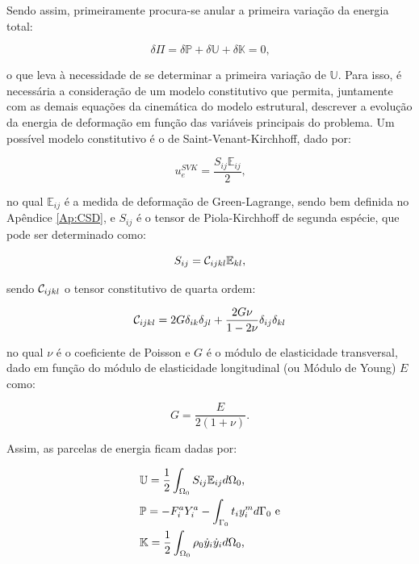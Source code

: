 Sendo assim, primeiramente procura-se anular a primeira variação da energia total:

\begin{equation}
    \delta\Pi=\delta\mathbb{P}+\delta\mathbb{U}+\delta\mathbb{K}=0\text{,}
\end{equation}

\noindent o que leva à necessidade de se determinar a primeira variação de $\mathbb{U}$. Para isso, é necessária a consideração de um modelo constitutivo que permita, juntamente com as demais equações da cinemática do modelo estrutural, descrever a evolução da energia de deformação em função das variáveis principais do problema. Um possível modelo constitutivo é o de Saint-Venant-Kirchhoff, dado por:

\begin{equation}
    u_e^{SVK}=\frac{S_{ij}\mathbb{E}_{ij}}{2}\text{,}
\end{equation}

\noindent no qual $\mathbb{E}_{ij}$ é a medida de deformação de Green-Lagrange, sendo bem definida no Apêndice \ref{Ap:CSD}, e $S_{ij}$ é o tensor de Piola-Kirchhoff de segunda espécie, que pode ser determinado como:

\begin{equation}
    S_{ij}=\mathcal{C}_{ijkl}\mathbb{E}_{kl}\text{,}
    \label{eq:CSD-S}
\end{equation}

\noindent sendo $\mathcal{C}_{ijkl}$ o tensor constitutivo de quarta ordem:

\begin{equation}
    \mathcal{C}_{ijkl}=2G\delta_{ik}\delta_{jl}+\frac{2G\nu}{1-2\nu}\delta_{ij}\delta_{kl}
\end{equation}

\noindent no qual $\nu$ é o coeficiente de Poisson e $G$ é o módulo de elasticidade transversal, dado em função do módulo de elasticidade longitudinal (ou Módulo de Young) $E$ como:

\begin{equation}
    G=\frac{E}{2(1+\nu)}\text{.}
\end{equation}

Assim, as parcelas de energia ficam dadas por:

\begin{subequations}
    \begin{align}
         & \mathbb{U}=\frac{1}{2}\int_{\Omega_0}{S_{ij}\mathbb{E}_{ij} d\Omega_0}\text{,}    \\
         & \mathbb{P}=-F_i^aY_i^a-\int_{\Gamma_0}{t_iy_i^m d\Gamma_0}\text{ e}             \\
         & \mathbb{K}=\frac{1}{2}\int_{\Omega_0}{\rho_0\dot{y}_i\dot{y}_i d\Omega_0}\text{,}
    \end{align}
\end{subequations}

